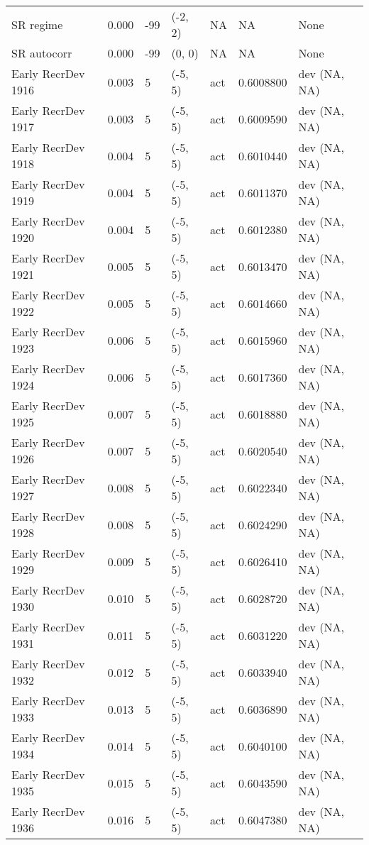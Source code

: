 \documentclass[11pt,
  english,
  a4paper,
]{article}
\begin{document}
\begin{landscape}
\begin{longtable}[t]{>{\raggedright\arraybackslash}p{6cm}lllll>{\raggedright\arraybackslash}p{4cm}}
SR regime & 0.000 & -99 & (-2, 2) & NA & NA & None\\
SR autocorr & 0.000 & -99 & (0, 0) & NA & NA & None\\
Early RecrDev 1916 & 0.003 & 5 & (-5, 5) & act & 0.6008800 & dev (NA, NA)\\
Early RecrDev 1917 & 0.003 & 5 & (-5, 5) & act & 0.6009590 & dev (NA, NA)\\
Early RecrDev 1918 & 0.004 & 5 & (-5, 5) & act & 0.6010440 & dev (NA, NA)\\
Early RecrDev 1919 & 0.004 & 5 & (-5, 5) & act & 0.6011370 & dev (NA, NA)\\
Early RecrDev 1920 & 0.004 & 5 & (-5, 5) & act & 0.6012380 & dev (NA, NA)\\
Early RecrDev 1921 & 0.005 & 5 & (-5, 5) & act & 0.6013470 & dev (NA, NA)\\
Early RecrDev 1922 & 0.005 & 5 & (-5, 5) & act & 0.6014660 & dev (NA, NA)\\
Early RecrDev 1923 & 0.006 & 5 & (-5, 5) & act & 0.6015960 & dev (NA, NA)\\
Early RecrDev 1924 & 0.006 & 5 & (-5, 5) & act & 0.6017360 & dev (NA, NA)\\
Early RecrDev 1925 & 0.007 & 5 & (-5, 5) & act & 0.6018880 & dev (NA, NA)\\
Early RecrDev 1926 & 0.007 & 5 & (-5, 5) & act & 0.6020540 & dev (NA, NA)\\
Early RecrDev 1927 & 0.008 & 5 & (-5, 5) & act & 0.6022340 & dev (NA, NA)\\
Early RecrDev 1928 & 0.008 & 5 & (-5, 5) & act & 0.6024290 & dev (NA, NA)\\
Early RecrDev 1929 & 0.009 & 5 & (-5, 5) & act & 0.6026410 & dev (NA, NA)\\
Early RecrDev 1930 & 0.010 & 5 & (-5, 5) & act & 0.6028720 & dev (NA, NA)\\
Early RecrDev 1931 & 0.011 & 5 & (-5, 5) & act & 0.6031220 & dev (NA, NA)\\
Early RecrDev 1932 & 0.012 & 5 & (-5, 5) & act & 0.6033940 & dev (NA, NA)\\
Early RecrDev 1933 & 0.013 & 5 & (-5, 5) & act & 0.6036890 & dev (NA, NA)\\
Early RecrDev 1934 & 0.014 & 5 & (-5, 5) & act & 0.6040100 & dev (NA, NA)\\
Early RecrDev 1935 & 0.015 & 5 & (-5, 5) & act & 0.6043590 & dev (NA, NA)\\
Early RecrDev 1936 & 0.016 & 5 & (-5, 5) & act & 0.6047380 & dev (NA, NA)\\

\end{longtable}
\end{landscape}
\end{document}
